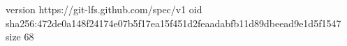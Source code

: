 version https://git-lfs.github.com/spec/v1
oid sha256:472de0a148f24174e07b5f17ea15f451d2feaadabfb11d89dbeead9e1d5f1547
size 68

